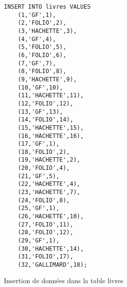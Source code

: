 \documentclass{article}
\begin{document}
\newpage
\begin{listing}[H]
	\begin{verbatim}
INSERT INTO livres VALUES
	(1,'GF',1),
	(2,'FOLIO',2),
	(3,'HACHETTE',3),
	(4,'GF',4),
	(5,'FOLIO',5),
	(6,'FOLIO',6),
	(7,'GF',7),
	(8,'FOLIO',8),
	(9,'HACHETTE',9),
	(10,'GF',10),
	(11,'HACHETTE',11),
	(12,'FOLIO',12),
	(13,'GF',13),
	(14,'FOLIO',14),
	(15,'HACHETTE',15),
	(16,'HACHETTE',16),
	(17,'GF',1),
	(18,'FOLIO',2),
	(19,'HACHETTE',2),
	(20,'FOLIO',4),
	(21,'GF',5),
	(22,'HACHETTE',4),
	(23,'HACHETTE',7),
	(24,'FOLIO',8),
	(25,'GF',1),
	(26,'HACHETTE',10),
	(27,'FOLIO',11),
	(28,'FOLIO',12),
	(29,'GF',1),
	(30,'HACHETTE',14),
	(31,'FOLIO',17),
	(32,'GALLIMARD',18);
\end{verbatim}
	\caption{Insertion de données dans la table livres}
\end{listing}
\newpage
\end{document}

